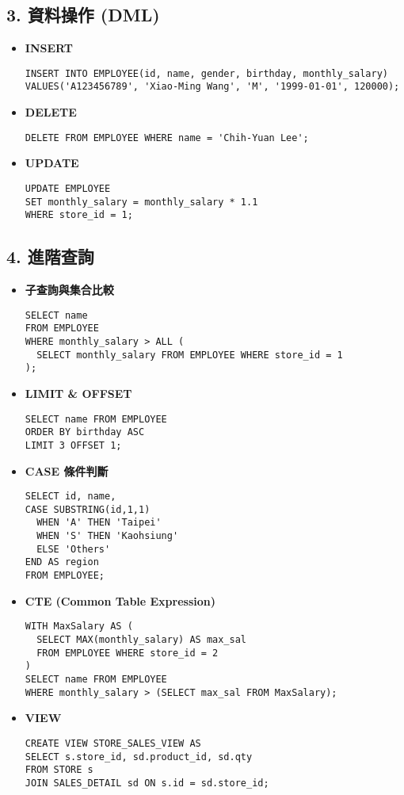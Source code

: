 \documentclass[12pt,a4paper]{article}
\begin{document}
\subsection*{3. 資料操作 (DML)}
\begin{itemize}
  \item \textbf{INSERT}
  \begin{verbatim}
INSERT INTO EMPLOYEE(id, name, gender, birthday, monthly_salary)
VALUES('A123456789', 'Xiao-Ming Wang', 'M', '1999-01-01', 120000);
  \end{verbatim}

  \item \textbf{DELETE}
  \begin{verbatim}
DELETE FROM EMPLOYEE WHERE name = 'Chih-Yuan Lee';
  \end{verbatim}

  \item \textbf{UPDATE}
  \begin{verbatim}
UPDATE EMPLOYEE
SET monthly_salary = monthly_salary * 1.1
WHERE store_id = 1;
  \end{verbatim}
\end{itemize}

\subsection*{4. 進階查詢}
\begin{itemize}
  \item \textbf{子查詢與集合比較}
  \begin{verbatim}
SELECT name
FROM EMPLOYEE
WHERE monthly_salary > ALL (
  SELECT monthly_salary FROM EMPLOYEE WHERE store_id = 1
);
  \end{verbatim}

  \item \textbf{LIMIT \& OFFSET}
  \begin{verbatim}
SELECT name FROM EMPLOYEE
ORDER BY birthday ASC
LIMIT 3 OFFSET 1;
  \end{verbatim}

  \item \textbf{CASE 條件判斷}
  \begin{verbatim}
SELECT id, name,
CASE SUBSTRING(id,1,1)
  WHEN 'A' THEN 'Taipei'
  WHEN 'S' THEN 'Kaohsiung'
  ELSE 'Others'
END AS region
FROM EMPLOYEE;
  \end{verbatim}

  \item \textbf{CTE (Common Table Expression)}
  \begin{verbatim}
WITH MaxSalary AS (
  SELECT MAX(monthly_salary) AS max_sal
  FROM EMPLOYEE WHERE store_id = 2
)
SELECT name FROM EMPLOYEE
WHERE monthly_salary > (SELECT max_sal FROM MaxSalary);
  \end{verbatim}

  \item \textbf{VIEW}
  \begin{verbatim}
CREATE VIEW STORE_SALES_VIEW AS
SELECT s.store_id, sd.product_id, sd.qty
FROM STORE s
JOIN SALES_DETAIL sd ON s.id = sd.store_id;
  \end{verbatim}
\end{itemize}
\end{document}
